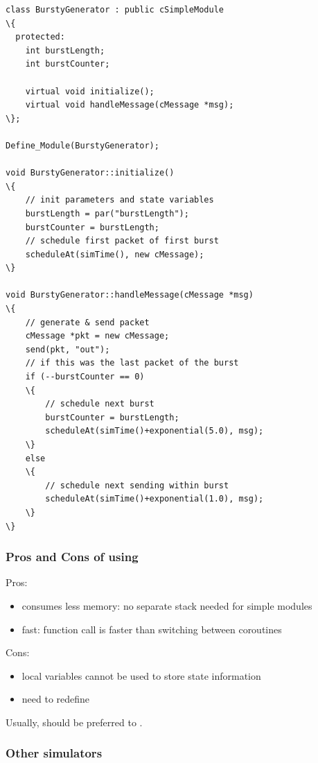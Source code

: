 \begin{Verbatim}[commandchars=\\\{\}]
class BurstyGenerator : public cSimpleModule
\{
  protected:
    int burstLength;
    int burstCounter;

    virtual void initialize();
    virtual void handleMessage(cMessage *msg);
\};

Define_Module(BurstyGenerator);

void BurstyGenerator::initialize()
\{
    // init parameters and state variables
    burstLength = par("burstLength");
    burstCounter = burstLength;
    // schedule first packet of first burst
    scheduleAt(simTime(), new cMessage);
\}

void BurstyGenerator::handleMessage(cMessage *msg)
\{
    // generate & send packet
    cMessage *pkt = new cMessage;
    send(pkt, "out");
    // if this was the last packet of the burst
    if (--burstCounter == 0)
    \{
        // schedule next burst
        burstCounter = burstLength;
        scheduleAt(simTime()+exponential(5.0), msg);
    \}
    else
    \{
        // schedule next sending within burst
        scheduleAt(simTime()+exponential(1.0), msg);
    \}
\}
\end{Verbatim}



\subsubsection{Pros and Cons of using }


Pros:
\begin{itemize}
  \item{consumes less memory: no separate stack needed for simple modules}
  \item{fast: function call is faster than switching between coroutines}
\end{itemize}

Cons:
\begin{itemize}
  \item{local variables cannot be used to store state information}
  \item{need to redefine }
\end{itemize}

Usually,  should be preferred to .


\subsubsection{Other simulators}


